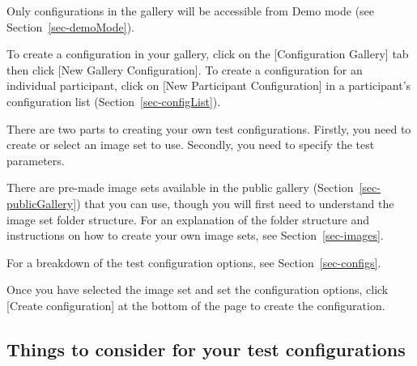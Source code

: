 \documentclass{article}
\begin{document}
Only configurations in the gallery will be accessible from Demo mode (see Section~\ref{sec-demoMode}).

To create a configuration in your gallery, click on the [Configuration Gallery] tab then click [New Gallery Configuration]. To create a configuration for an individual participant, click on [New Participant Configuration] in a participant's configuration list (Section~\ref{sec-configList}).

There are two parts to creating your own test configurations. Firstly, you need to create or select an image set to use. Secondly, you need to specify the test parameters.

There are pre-made image sets available in the public gallery (Section~\ref{sec-publicGallery}) that you can use, though you will first need to understand the image set folder structure. For an explanation of the folder structure and instructions on how to create your own image sets, see Section~\ref{sec-images}.

For a breakdown of the test configuration options, see Section~\ref{sec-configs}.

Once you have selected the image set and set the configuration options, click [Create configuration] at the bottom of the page to create the configuration.

\subsection{Things to consider for your test configurations}
\end{document}
